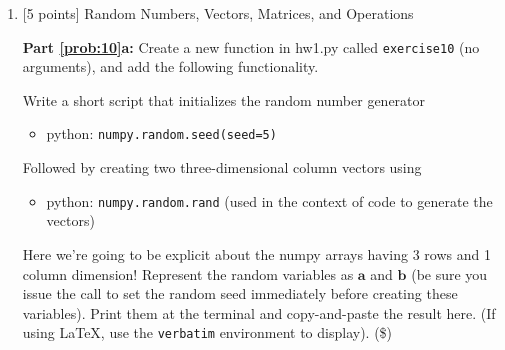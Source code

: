 \documentclass[10pt]{article}
\begin{document}
\begin{enumerate}
\begin{verbatim}
$ ./hw1.py
Threw double-six 2.6%
$ ./hw1.py
Threw double-six 2.6%
\end{verbatim}

If I comment out {\tt seed=8}, I will get different results:

\begin{verbatim}
$ for i in $(seq 1 9); do echo -n "$i: " && ./hw1.py; done
1: Threw double-six 2.7%
2: Threw double-six 2.4%
3: Threw double-six 3.4%
4: Threw double-six 2.1%
5: Threw double-six 2.6%
6: Threw double-six 2.6%
7: Threw double-six 2.3%
8: Threw double-six 3.2%
9: Threw double-six 3.2%
\end{verbatim}

Putting back in {\tt seed=8}, I go back to the same result:

\begin{verbatim}
$ for i in $(seq 1 10); do echo -n "$i: " && ./hw1.py; done
1: Threw double-six 2.6%
2: Threw double-six 2.6%
3: Threw double-six 2.6%
4: Threw double-six 2.6%
5: Threw double-six 2.6%
6: Threw double-six 2.6%
7: Threw double-six 2.6%
8: Threw double-six 2.6%
9: Threw double-six 2.6%
10: Threw double-six 2.6%
\end{verbatim}

Being able to count on a "random" number allows one to write tests for such functions.

\item \label{prob:10} [5 points] Random Numbers, Vectors, Matrices, and Operations

{\bf Part \ref{prob:10}a:} Create a new function in hw1.py called {\tt exercise10} (no arguments), and add the following functionality.

Write a short script that initializes the random number generator
\begin{itemize}
\item[] python: {\tt numpy.random.seed(seed=5)}
\end{itemize}
Followed by creating two three-dimensional column vectors using
\begin{itemize}
\item[] python: {\tt numpy.random.rand} (used in the context of code to generate the vectors)
\end{itemize}
Here we're going to be explicit about the numpy arrays having 3 rows and 1 column dimension!
Represent the random variables as $\mathbf{a}$ and $\mathbf{b}$ (be sure you issue the call to set the random seed immediately before creating these variables).  Print them at the terminal and copy-and-paste the result here. (If using \LaTeX, use the {\tt verbatim} environment to display). (\$)


\end{enumerate}
\end{document}

